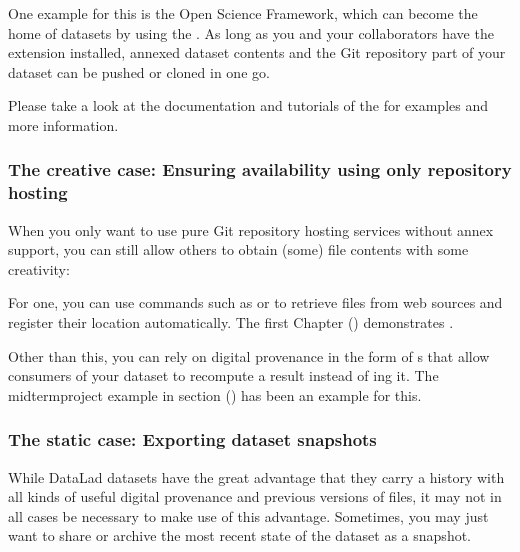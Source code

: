 \sphinxAtStartPar
One example for this is the Open Science Framework, which can become the home of datasets by using the .
As long as you and your collaborators have the extension installed, annexed dataset
contents and the Git repository part of your dataset can be pushed or cloned in one go.

\sphinxAtStartPar
Please take a look at the documentation and tutorials of the  for examples and more information.


\subsubsection{The creative case: Ensuring availability using only repository hosting}
\label{\detokenize{basics/101-138-sharethirdparty:the-creative-case-ensuring-availability-using-only-repository-hosting}}
\sphinxAtStartPar
When you only want to use pure Git repository hosting services without annex support, you can still allow others to obtain (some) file contents with some creativity:

\sphinxAtStartPar
For one, you can use commands such as  or   to retrieve files from web sources and register their location automatically.
The first Chapter {\hyperref[\detokenize{basics/basics-datasets:chapter-datasets}]{}} () demonstrates .

\sphinxAtStartPar
Other than this, you can rely on digital provenance in the form of {\hyperref[\detokenize{glossary:term-run-record}]{}}s that allow consumers of your dataset to recompute a result instead of ing it.
The midterm\sphinxhyphen{}project example in section {\hyperref[\detokenize{basics/101-130-yodaproject:yoda-project}]{}} () has been an example for this.


\subsubsection{The static case: Exporting dataset snapshots}
\label{\detokenize{basics/101-138-sharethirdparty:the-static-case-exporting-dataset-snapshots}}
\sphinxAtStartPar
While DataLad datasets have the great advantage that they carry a history with all kinds of useful digital provenance and previous versions of files, it may not in all cases be necessary to make use of this advantage.
Sometimes, you may just want to share or archive the most recent state of the dataset as a snapshot.

